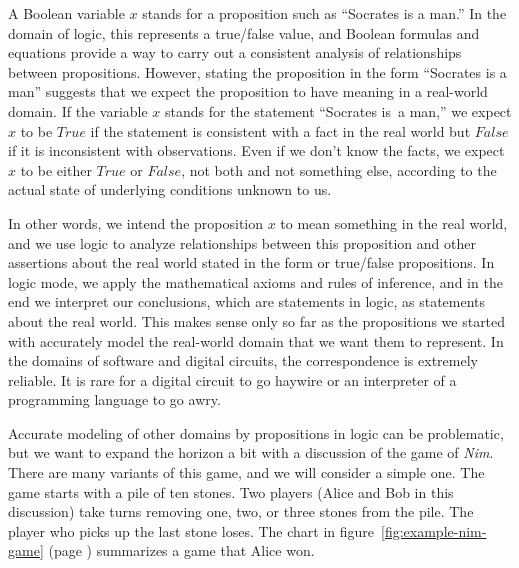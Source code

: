 {{A Boolean variable $x$
stands for a proposition such as ``Socrates is a man.''
In the domain of logic, this represents a true/false value,
and Boolean formulas and equations provide a way to carry out
a consistent analysis of relationships between propositions.
However, stating the proposition in the form ``Socrates is a man''
suggests that we expect the proposition to have meaning in a real-world domain.
If the variable $x$ stands for the statement ``Socrates is\ a man,''
we expect $x$ to be $True$ if the statement is consistent with a fact
in the real world but $False$ if it is inconsistent with observations.
Even if we don't know the facts, we expect $x$ to be either $True$ or $False$,
not both and not something else,
according to the actual state of underlying conditions unknown to us.

In other words, we intend the proposition $x$
to mean something in the real world,
and we use logic to analyze relationships between this proposition and other
assertions about the real world stated in the form or true/false propositions.
In logic mode, we apply the mathematical axioms and rules of inference,
and in the end we interpret our conclusions, which are statements in logic,
as statements about the real world.
This makes sense only so far as the propositions we started with
accurately model the real-world domain that we want them to represent.
In the domains of software and digital circuits,
the correspondence is extremely reliable.
It is rare for a digital circuit to go haywire or an interpreter of
a programming language to go awry.

Accurate modeling of other domains by propositions in logic can be problematic,
but we want to expand the horizon a bit with a discussion
of the game of \emph{Nim}.
There are many variants of this game, and we will consider a simple one.
The game starts with a pile of ten stones. Two players (Alice and Bob in this discussion)
take turns removing one, two, or three stones from the pile.
The player who picks up the last stone loses.
The chart in
figure~\ref{fig:example-nim-game} (page \pageref{fig:example-nim-game})
summarizes a game that Alice won.

}}
